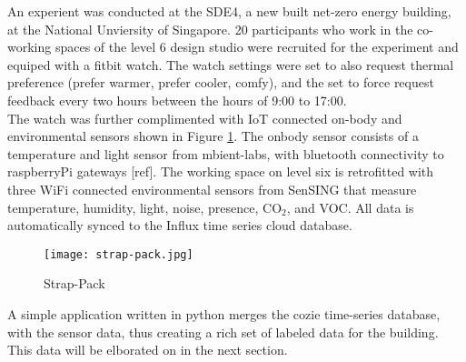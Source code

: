 
An experient was conducted at the SDE4, a new built net-zero energy building, at the National Unviersity of Singapore. 20 participants who work in the co-working spaces of the level 6 design studio were recruited for the experiment and equiped with a fitbit watch. The watch settings were set to also request thermal preference (prefer warmer, prefer cooler, comfy), and the set to force request feedback every two hours between the hours of 9:00 to 17:00. \\

The watch was further complimented with IoT connected on-body and environmental sensors shown in Figure \ref{fig:strappack}. The onbody sensor consists of a temperature and light sensor from mbient-labs, with bluetooth connectivity to raspberryPi gateways [ref]. The working space on level six is retrofitted with three WiFi connected environmental sensors from SenSING that measure temperature, humidity, light, noise, presence, CO$_2$, and VOC. All data is automatically synced to the Influx time series cloud database.\\


\begin{figure}
\begin{center}
\texttt{[image: strap-pack.jpg]}
\caption{Strap-Pack}
\label{fig:strappack}
\end{center}
\end{figure}

A simple application written in python merges the cozie time-series database, with the sensor data, thus creating a rich set of labeled data for the building. This data will be elborated on in the next section. 